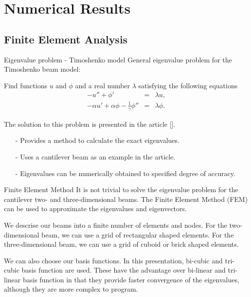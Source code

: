 \documentclass[8pt]{beamer}
\begin{document}
\section{Numerical Results}
    \subsection{Finite Element Analysis}
        \begin{frame}{Eigenvalue problem - Timoshenko model}
            General eigenvalue problem for the Timoshenko beam model:
        
            Find functions $u$ and $\phi$ and a real number $\lambda$ satisfying the following equations
            \begin{eqnarray}
            -u'' + \phi' &=& \lambda u, \label{eq:Timo:EigenvalueProblem1}\\
            -\alpha u' + \alpha\phi - \frac{1}{\gamma}\phi'' &=& \lambda\phi.\label{eq:Timo:EigenvalueProblem2}
            \end{eqnarray}
        
            The solution to this problem is presented in the article [\cite{VV06}].
        
            \begin{itemize}
                \item[-] Provides a method to calculate the exact eigenvalues.
                \item[-] Uses a cantilever beam as an example in the article.
                \item[-] Eigenvalues can be numerically obtained to specified degree of accuracy.
            \end{itemize}
        
        \end{frame}

        \begin{frame}{Finite Element Method}
            It is not trivial to solve the eigenvalue problem for the cantilever two- and three-dimensional beams. The Finite Element Method (FEM) can be used to approximate the eigenvalues and eigenvectors.

            We descrise our beams into a finite number of elements and nodes. For the two-dimensional beam, we can use a grid of rectangular shaped elements. For the three-dimensional beam, we can use a grid of cuboid or brick shaped elements.

            We can also choose our basis functions. In this presentation, bi-cubic and tri-cubic basis function 
            are used. These have the advantage over bi-linear and tri-linear basis function in that they provide faster convergence of the eigenvalues, although they are more complex to program.
        \end{frame}
\end{document}
